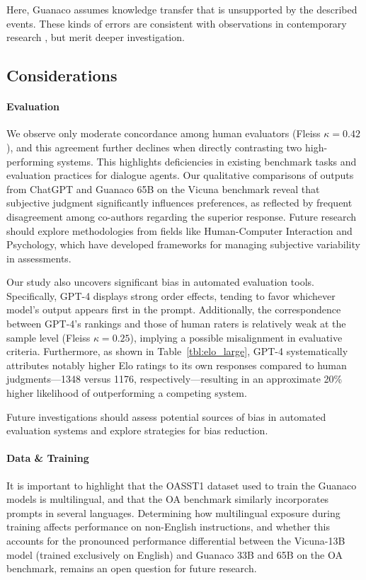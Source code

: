 Here, {Guanaco} assumes knowledge transfer that is unsupported by the described events. These kinds of errors are consistent with observations in contemporary research \cite{sap2022neural}, but merit deeper investigation.

\subsection{Considerations}
\label{ssec:considerations}

\paragraph{Evaluation}

We observe only moderate concordance among human evaluators (Fleiss $\kappa=0.42$), and this agreement further declines when directly contrasting two high-performing systems. This highlights deficiencies in existing benchmark tasks and evaluation practices for dialogue agents. Our qualitative comparisons of outputs from ChatGPT and {Guanaco} 65B on the Vicuna benchmark reveal that subjective judgment significantly influences preferences, as reflected by frequent disagreement among co-authors regarding the superior response. Future research should explore methodologies from fields like Human-Computer Interaction and Psychology, which have developed frameworks for managing subjective variability in assessments.

Our study also uncovers significant bias in automated evaluation tools. Specifically, GPT-4 displays strong order effects, tending to favor whichever model’s output appears first in the prompt. Additionally, the correspondence between GPT-4’s rankings and those of human raters is relatively weak at the sample level (Fleiss $\kappa=0.25$), implying a possible misalignment in evaluative criteria. Furthermore, as shown in Table~\ref{tbl:elo_large}, GPT-4 systematically attributes notably higher Elo ratings to its own responses compared to human judgments—1348 versus 1176, respectively—resulting in an approximate 20\% higher likelihood of outperforming a competing system.

Future investigations should assess potential sources of bias in automated evaluation systems and explore strategies for bias reduction.

\paragraph{Data \& Training} It is important to highlight that the OASST1 dataset used to train the {Guanaco} models is multilingual, and that the OA benchmark similarly incorporates prompts in several languages. Determining how multilingual exposure during training affects performance on non-English instructions, and whether this accounts for the pronounced performance differential between the Vicuna-13B model (trained exclusively on English) and {Guanaco} 33B and 65B on the OA benchmark, remains an open question for future research.

